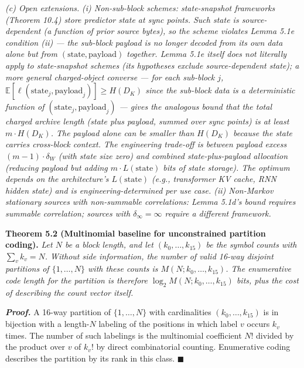 \documentclass[
]{article}
\begin{document}
\emph{(c) Open extensions.} \emph{(i) Non-sub-block schemes:
state-snapshot frameworks (Theorem 10.4) store predictor state at
sync points. Such state is source-dependent (a function of prior
source bytes), so the scheme violates Lemma 5.1e condition (ii) ---
the sub-block payload is no longer decoded from its own data alone
but from $(\mathrm{state}, \mathrm{payload})$ together. Lemma 5.1e
itself does not literally apply to state-snapshot schemes (its
hypotheses exclude source-dependent state); a more general
charged-object converse — for each sub-block $j$,
$\mathbb{E}[\ell(\mathrm{state}_j, \mathrm{payload}_j)] \geq H(D_K)$
since the sub-block data is a deterministic function of
$(\mathrm{state}_j, \mathrm{payload}_j)$ — gives the analogous bound
that the total charged archive length (state plus payload, summed
over sync points) is at least $m \cdot H(D_K)$. The payload alone
can be smaller than $H(D_K)$ because the state carries cross-block
context. The engineering
trade-off is between payload excess $(m-1) \cdot \delta_W$ (with
state size zero) and combined state-plus-payload allocation
(reducing payload but adding $m \cdot L(\mathrm{state})$ bits of
state storage). The optimum depends on the architecture's
$L(\mathrm{state})$ (e.g., transformer KV cache, RNN hidden state)
and is engineering-determined per use case.
(ii) Non-Markov stationary sources with non-summable correlations:
Lemma 5.1d's bound requires summable correlation; sources with
$\delta_\infty = \infty$ require a different framework.}

\textbf{Theorem 5.2 (Multinomial baseline for unconstrained partition
coding).} \emph{Let $N$ be a block length, and let
$(k_0, \ldots, k_{15})$ be the symbol counts with $\sum_v k_v = N$.
Without side information, the number of valid 16-way disjoint
partitions of $\{1, \ldots, N\}$ with these counts is
$M(N; k_0, \ldots, k_{15})$. The enumerative code length for the
partition is therefore $\log_2 M(N; k_0, \ldots, k_{15})$ bits, plus
the cost of describing the count vector itself.}

\emph{\textbf{Proof.}} A 16-way partition of $\{1, \ldots, N\}$ with
cardinalities $(k_0, \ldots, k_{15})$ is in bijection with a length-$N$
labeling of the positions in which label $v$ occurs $k_v$ times. The
number of such labelings is the multinomial coefficient $N!$ divided
by the product over $v$ of $k_v!$ by direct combinatorial counting.
Enumerative coding describes the partition by its rank in this class.
\hfill$\blacksquare$
\end{document}
